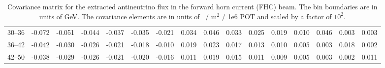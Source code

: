 \begin{table}[tb]
{\begin{tabular}{c|ccccccccccccccc}
    30--36 & -0.072 & -0.051 & -0.044 & -0.037 & -0.035 & -0.021 &  0.034 &  0.046 &  0.033 &  0.025 &  0.019 &  0.010 &  0.046 &  0.003 &  0.003 \\
    36--42 & -0.042 & -0.030 & -0.026 & -0.021 & -0.018 & -0.010 &  0.019 &  0.023 &  0.017 &  0.013 &  0.010 &  0.005 &  0.003 &  0.018 &  0.002 \\
    42--50 & -0.038 & -0.029 & -0.026 & -0.021 & -0.020 & -0.016 &  0.011 &  0.019 &  0.015 &  0.011 &  0.009 &  0.005 &  0.003 &  0.002 &  0.011 \\
    \hline
    \end{tabular} }
\caption{Covariance matrix for the extracted antineutrino flux in the forward horn current (FHC) beam. The bin boundaries are in units of GeV. The covariance elements
are in units of \numubar~/ m$^2$ / 1e6 POT and scaled by a factor of $10^2$.}
\label{cov:FHC-anti-flux}
\end{table}


